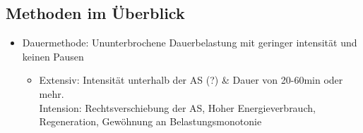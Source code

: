 \subsection{Methoden im Überblick}
\begin{itemize}
  \item Dauermethode: Ununterbrochene Dauerbelastung mit geringer intensität und keinen Pausen
    \begin{itemize}
      \item Extensiv: Intensität unterhalb der AS (?) \& Dauer von 20-60min oder mehr.\\
                Intension: Rechtsverschiebung der AS, Hoher Energieverbrauch, Regeneration, Gewöhnung an Belastungsmonotonie
    \end{itemize}
\end{itemize}
